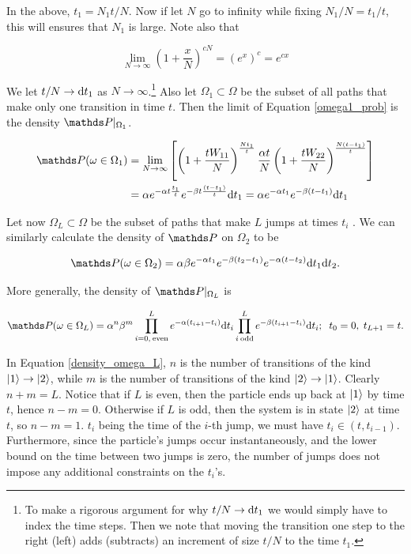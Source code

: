In the above, $t_1 = N_1t/N$. Now if let $N$ go to infinity while fixing $N_1/N = t_1/t$, this will ensures that $N_1$ is large. Note also that

$$\lim_{N \rightarrow \infty} (1+ \frac{x}{N})^{c N} = (e^x)^c = e^{c x}$$

We let $t/N \rightarrow \mathrm{d} t_1 $ as $N \rightarrow \infty$.\footnote{To make a rigorous argument for why $t/N \rightarrow \mathrm{d} t_1$ we would simply have to index the time steps. Then we note that moving the transition one step to the right (left) adds (subtracts) an increment of size $t/N$ to the time $t_1$.}  Also let $\Omega_1 \subset \Omega$ be the subset of all paths that make only one transition in time $t$. Then the limit of Equation \ref{omega1_prob} is the density $\bP\lvert_{\Omega_1}$.

\begin{align}
  \bP(\omega \in \Omega_1 ) &= \lim_{N \rightarrow \infty}\left [ \left(1 + \frac{tW_{11}}{N}\right)^{\frac{Nt_1}{t}} \frac{\alpha t}{N}  \left(1+\frac{tW_{22}}{N}\right)^{\frac{N(t-t_1)}{t}} \right ] \\
  &= \alpha e^{-\alpha t\frac{t_1}{t}}e^{-\beta t \frac{(t-t_1)}{t}}\rmd t_1 = \alpha e^{-\alpha t_1}e^{-\beta (t-t_1)} \rmd t_1
\end{align}

Let now $\Omega_L \subset \Omega$ be the subset of paths that make $L$ jumps at times $t_i$ . We can similarly calculate the density of $\bP$ on $\Omega_2$ to be

\begin{equation}
  \bP(\omega \in \Omega_2) = \alpha \beta e^{-\alpha t_1}e^{-\beta (t_2 - t_1)}e^{-\alpha (t-t_2)} \rmd t_1\rmd t_2.
\end{equation}

More generally, the density of $\bP|_{\Omega_L}$ is

\begin{equation}\label{density_omega_L}
  \bP(\omega \in \Omega_L) = \alpha^n\beta^m  \prod_{i =0, \:\text{even}}^{L} e^{-\alpha(t_{i+1} - t_{i})}\rmd t_i \prod_{i \: \text{odd}}^L e^{-\beta(t_{i+1} - t_{i})} \rmd t_i; \; \; t_0 = 0, \; t_{L+1} = t.
\end{equation}

In Equation \ref{density_omega_L}, $n$ is the number of transitions of the kind $\ket{1} \rightarrow \ket{2}$, while $m$ is the number of transitions of the kind $\ket{2} \rightarrow \ket{1}$. Clearly $n+m = L$. Notice that if $L$ is even, then the particle ends up back at $\ket{1}$ by time $t$, hence $n - m = 0$. Otherwise if $L$ is odd, then the system is in state $\ket{2}$ at time $t$, so $n-m = 1$. $t_i$ being the time of the $i$-th jump, we must have $t_i \in (t, t_{i-1})$. Furthermore, since the particle's jumps occur instantaneously, and the lower bound on the time between two jumps is zero, the number of jumps does not impose any additional constraints on the $t_i$'s.

